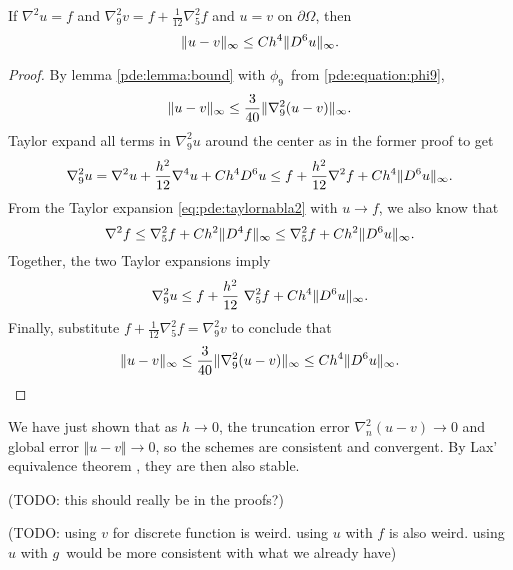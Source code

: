 \begin{theorem}\label{thm:nine}
If $\nabla^2 u = f$ and $\nabla_9^2 v = f + \frac{1}{12} \nabla_5^2 f$ and $u = v$ on $\partial \Omega$, then
$$
\lVert u - v \rVert_\infty \leq C h^4 \lVert D^6 u \rVert_\infty.
$$
\end{theorem}
\begin{proof}
By lemma \ref{pde:lemma:bound} with $\phi_9$ from \ref{pde:equation:phi9},
$$
\lVert u - v \rVert_\infty \leq \frac{3}{40} \lVert \nabla_9^2 (u  - v) \rVert_\infty.
$$
Taylor expand all terms in $\nabla_9^2 u$ around the center as in the former proof to get
\begin{equation*}
\nabla_9^2 u = \nabla^2 u + \frac{h^2}{12} \nabla^4 u + Ch^4 D^6 u \leq f + \frac{h^2}{12} \nabla^2 f + Ch^4 \lVert D^6 u \rVert_\infty.
\end{equation*}
From the Taylor expansion \ref{eq:pde:taylornabla2} with $u \rightarrow f$, we also know that
\begin{equation*}
\nabla^2 f \leq \nabla_5^2 f + Ch^2 \lVert D^4 f \rVert_\infty \leq \nabla_5^2 f + Ch^2 \lVert D^6 u \rVert_\infty.
\end{equation*}
Together, the two Taylor expansions imply
\begin{equation*}
	\nabla_9^2 u \leq f + \frac{h^2}{12} \nabla_5^2 f + Ch^4 \inorm{D^6 u}.
\end{equation*}
Finally, substitute $f + \frac{1}{12} \nabla_5^2 f = \nabla_9^2 v$ to conclude that
\begin{equation*}
  \lVert u-v \rVert_\infty \leq \frac{3}{40} \lVert \nabla_9^2 (u - v) \rVert_\infty \leq C h^4 \lVert D^6 u \rVert_\infty. \qedhere
\end{equation*}
\end{proof}

We have just shown that as $h \rightarrow 0$, the truncation error $\nabla_n^2 (u - v) \rightarrow 0$ and global error $\Vert u - v \Vert \rightarrow 0$, so the schemes are consistent and convergent.
By Lax' equivalence theorem \cite{owren}, they are then also stable.

(TODO: this should really be in the proofs?)

(TODO: using $v$ for discrete function is weird. using $u$ with $f$ is also weird. using $u$ with $g$ would be more consistent with what we already have)

